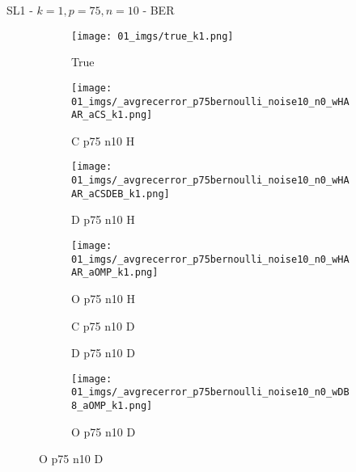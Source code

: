 \begin{frame}{SL1 - $k=1,p=75,n=10$ - BER}{}
\begin{figure}
\begin{subfigure}{0.13\textwidth}
\texttt{[image: 01\_imgs/true\_k1.png]}
\caption*{\tiny True}
\end{subfigure}
\begin{subfigure}{0.13\textwidth}
\texttt{[image: 01\_imgs/\_avgrecerror\_p75bernoulli\_noise10\_n0\_wHAAR\_aCS\_k1.png]}
\caption*{\tiny C p75 n10 H}
\end{subfigure}
\begin{subfigure}{0.13\textwidth}
\texttt{[image: 01\_imgs/\_avgrecerror\_p75bernoulli\_noise10\_n0\_wHAAR\_aCSDEB\_k1.png]}
\caption*{\tiny D p75 n10 H}
\end{subfigure}
\begin{subfigure}{0.13\textwidth}
\texttt{[image: 01\_imgs/\_avgrecerror\_p75bernoulli\_noise10\_n0\_wHAAR\_aOMP\_k1.png]}
\caption*{\tiny O p75 n10 H}
\end{subfigure}
\begin{subfigure}{0.13\textwidth}
\caption*{\tiny C p75 n10 D}
\end{subfigure}
\begin{subfigure}{0.13\textwidth}
\caption*{\tiny D p75 n10 D}
\end{subfigure}
\begin{subfigure}{0.13\textwidth}
\texttt{[image: 01\_imgs/\_avgrecerror\_p75bernoulli\_noise10\_n0\_wDB8\_aOMP\_k1.png]}
\caption*{\tiny O p75 n10 D}
\end{subfigure}

\vspace{5pt}


\end{figure}
\end{frame}
